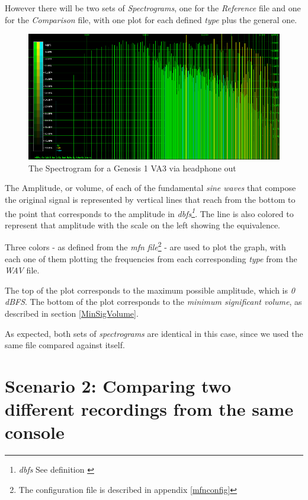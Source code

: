 \documentclass[10pt,a4paper]{report}
\newcommand{\defineCite}[2]{
	\textit{\acrshort{#1}\footnote{\textit{\acrlong{#1}} #2}}}
\begin{document}
However there will be two sets of \textit{Spectrograms}, one for the \textit{Reference} file and one for the \textit{Comparison} file, with one plot for each defined \textit{type} plus the general one.

\begin{figure}[H]
	\centering
	\includegraphics[width=1.0\linewidth]{images/interpretation/Plot2-SameFile-FM-Spectrogram.png}
	\caption[Spectrogram]{The Spectrogram for a Genesis 1 VA3 via headphone out}
	\label{fig:plot2-samefile-fm-spectrogram}
\end{figure}

The Amplitude, or volume, of each of the fundamental \textit{sine waves} that compose the original signal is represented by vertical lines that reach from the bottom to the point that corresponds to the amplitude in \defineCite{dbfs}{See definition \cite{dbfs}}. The line is also colored to represent that amplitude with the scale on the left showing the equivalence.

Three colors - as defined from the \textit{mfn file}\footnote{The configuration file is described in appendix \ref{mfnconfig}} - are used to plot the graph, with each one of them plotting the frequencies from each corresponding \textit{type} from the \textit{WAV} file.

The top of the plot corresponds to the maximum possible amplitude, which is \textit{0 dBFS}. The bottom of the plot corresponds to the \textit{minimum significant volume}, as described in section \ref{MinSigVolume}.

As expected, both sets of \textit{spectrograms} are identical in this case, since we used the same file compared against itself.

\section{Scenario 2: Comparing two different recordings from the same console}
\end{document}
